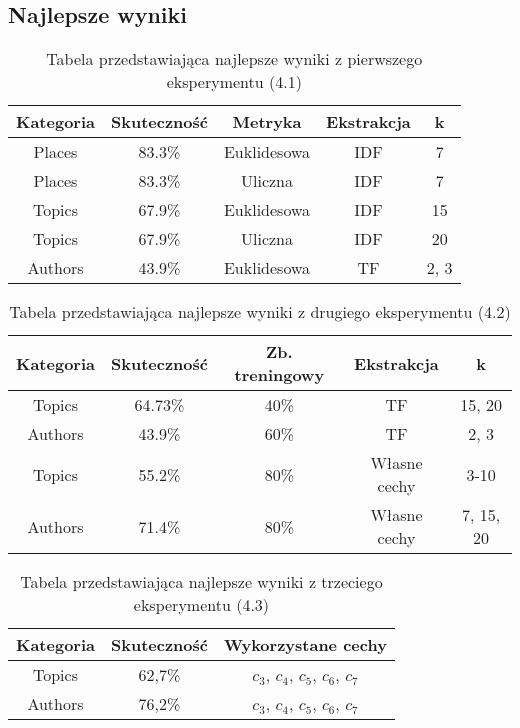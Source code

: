 \documentclass{classrep}
\begin{document}
\subsection{Najlepsze wyniki}
\begin{table}[H]
	\centering
	\begin{tabular}{c c c c c} 
		\hline
		\textbf{Kategoria} & \textbf{Skuteczność} & \textbf{Metryka} & \textbf{Ekstrakcja} &  \textbf{k} \\ [0.5ex]
		\hline
		\hline 
		Places & 83.3\% & Euklidesowa & IDF & 7 \\
		Places & 83.3\% & Uliczna & IDF & 7 \\
		Topics & 67.9\% & Euklidesowa & IDF & 15 \\
		Topics & 67.9\% & Uliczna & IDF & 20 \\
		Authors & 43.9\% & Euklidesowa & TF & 2, 3 \\
		\hline
	\end{tabular}
	\caption{Tabela przedstawiająca najlepsze wyniki z pierwszego eksperymentu (4.1)}
\end{table}

\begin{table}[H]
	\centering
	\begin{tabular}{c c c c c} 
		\hline
		\textbf{Kategoria} & \textbf{Skuteczność} & \textbf{Zb. treningowy} & \textbf{Ekstrakcja} &  \textbf{k} \\ [0.5ex]
		\hline
		\hline 
		Topics & 64.73\% & 40\% & TF & 15, 20 \\
		Authors & 43.9\% & 60\% & TF & 2, 3 \\
		Topics & 55.2\% & 80\% & Własne cechy & 3-10 \\
		Authors & 71.4\% & 80\% & Własne cechy & 7, 15, 20 \\
		\hline
	\end{tabular}
	\caption{Tabela przedstawiająca najlepsze wyniki z drugiego eksperymentu (4.2)}
\end{table}

\begin{table}[H]
	\centering
	\begin{tabular}{c c c} 
		\hline
		\textbf{Kategoria} & \textbf{Skuteczność} & \textbf{Wykorzystane cechy} \\ [0.5ex]
		\hline
		\hline 
		Topics & 62,7\% & $c_{3}$, $c_{4}$, $c_{5}$, $c_{6}$, $c_{7}$ \\
		Authors & 76,2\% & $c_{3}$, $c_{4}$, $c_{5}$, $c_{6}$, $c_{7}$ \\
		\hline
	\end{tabular}
	\caption{Tabela przedstawiająca najlepsze wyniki z trzeciego eksperymentu (4.3)}
\end{table}
\end{document}
